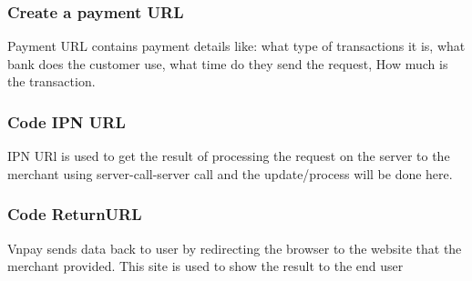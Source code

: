\documentclass[12pt,a4paper]{article}
\begin{document}
\subsubsection{Create a payment URL}
Payment URL contains payment details like: what type of transactions it is, what bank does the customer use, what time do they send the request, How much is the transaction. 
\subsubsection{Code IPN URL}
IPN URl is used to get the result of processing the request on the server to the merchant using server-call-server call and the update/process will be done here.
\subsubsection{Code ReturnURL}
Vnpay sends data back to user by redirecting the browser to the website that the merchant provided. This site is used to show the result to the end user
\end{document}
